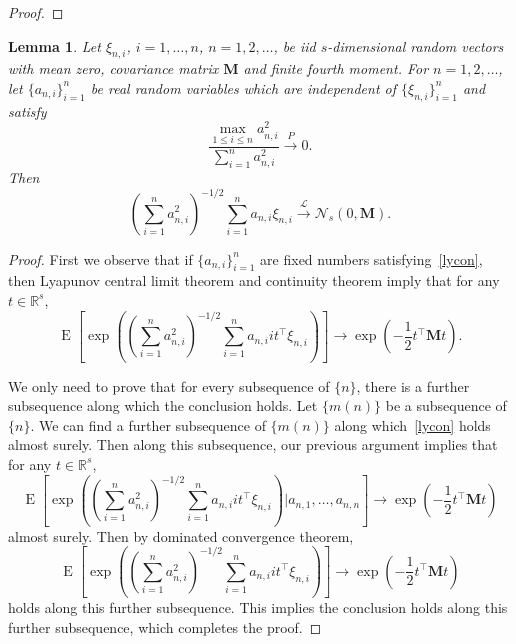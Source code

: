 \documentclass[12pt]{article} %
\DeclareMathOperator{\myE}{E}
\newcommand{\bM}{\mathbf{M}}
\newtheorem{lemma}{Lemma}
\theoremstyle{definition}
\begin{document}
\begin{appendices}
\begin{proof}
\end{proof}

\begin{lemma}
    Let $\xi_{n,i}$, $i=1,\ldots, n$, $n=1,2,\ldots$, be iid $s$-dimensional random vectors with mean zero, covariance matrix $\bM$ and finite fourth moment.
    For $n=1,2,\ldots$, let $\{a_{n,i}\}_{i=1}^n$ be real random variables which are independent of $\{\xi_{n,i}\}_{i=1}^n$ and satisfy 
    \begin{equation}\label{lycon}
        \frac{\max_{1\leq i\leq n}a_{n,i}^2}{\sum_{i=1}^n a_{n,i}^2}\xrightarrow{P}0.
    \end{equation}
    Then
    \begin{equation*}
    (\sum_{i=1}^n a_{n,i}^2)^{-1/2}\sum_{i=1}^n a_{n,i}\xi_{n,i} 
    \xrightarrow{\mathcal{L}}\mathcal{N}_s(0,\bM).
    \end{equation*}
    \label{CLTLEMMA}
\end{lemma}
\begin{proof}
    First we observe that if $\{a_{n,i}\}_{i=1}^n$ are fixed numbers satisfying~\eqref{lycon}, then Lyapunov central limit theorem and continuity theorem imply that 
    for any $t\in\mathbb{R}^s$,
    \begin{equation*}
        \myE\left[\exp\left(
    (\sum_{i=1}^n a_{n,i}^2)^{-1/2}\sum_{i=1}^n a_{n,i}it^\top \xi_{n,i} 
    \right)\right]
    \to
    \exp\left(-\frac{1}{2} t^\top \bM t\right).
    \end{equation*}

    We only need to prove that for every subsequence of $\{n\}$, there is a further subsequence along which the conclusion holds.
    Let $\{m(n)\}$  be a subsequence of $\{n\}$.
    We can find a further subsequence of $\{m(n)\}$ along which~\eqref{lycon} holds almost surely.
    Then along this subsequence, our previous argument implies that
    for any $t\in\mathbb{R}^s$,
    \begin{equation*}
        \myE
       \left[ 
        \exp\left(
    (\sum_{i=1}^n a_{n,i}^2)^{-1/2}\sum_{i=1}^n a_{n,i}it^\top \xi_{n,i} 
    \right)
    \bigg| a_{n,1},\ldots, a_{n,n}
\right]
    \to
    \exp\left(-\frac{1}{2} t^\top \bM t\right)
    \end{equation*}
    almost surely.
    Then by dominated convergence theorem,
    \begin{equation*}
        \myE
       \left[ 
        \exp\left(
    (\sum_{i=1}^n a_{n,i}^2)^{-1/2}\sum_{i=1}^n a_{n,i}it^\top \xi_{n,i} 
    \right)
\right]
    \to
    \exp\left(-\frac{1}{2} t^\top \bM t\right)
    \end{equation*}
    holds along this further subsequence. This implies the conclusion holds along this further subsequence, which completes the proof.





\end{proof}
\end{appendices}
\end{document}
